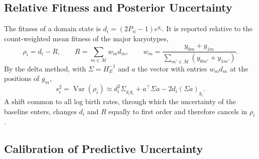 \documentclass[11pt]{article}
\begin{document}
\subsection{Relative Fitness and Posterior Uncertainty}
\label{sec:sj-relative}

The fitness of a domain state is $d_i=(2P_{ii}-1)e^{g_i}$. It is reported
relative to the count-weighted mean fitness of the major karyotypes,
\begin{equation}
  \rho_i=d_i-R,\qquad R=\sum_{m\in\mathcal{M}}w_md_m,\qquad
  w_m=\frac{y_{0m}+y_{1m}}{\sum_{m'\in\mathcal{M}}(y_{0m'}+y_{1m'})}.
  \label{eq:relative}
\end{equation}
By the delta method, with $\Sigma=H_E^{-1}$ and $a$ the vector with entries
$w_md_m$ at the positions of $g_m$,
\begin{equation}
  s_i^2=\operatorname{Var}(\rho_i)\approx d_i^2\Sigma_{g_ig_i}+a^\top\Sigma a-2d_i(\Sigma a)_{g_i}.
  \label{eq:relative-var}
\end{equation}
A shift common to all log birth rates, through which the uncertainty of the
baseline enters, changes $d_i$ and $R$ equally to first order and therefore
cancels in $\rho_i$.

\subsection{Calibration of Predictive Uncertainty}
\label{sec:sj-calibration}
\end{document}
